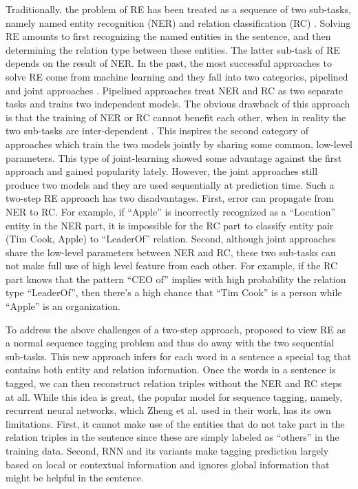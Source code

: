 Traditionally, the problem of RE has been treated as a sequence of two
sub-tasks, namely named entity recognition (NER) \cite{Nadeau2007} and relation
classification (RC) \cite{Zeng2014}.
Solving RE amounts to first recognizing the
named entities in the sentence, and then determining the relation type
between these entities. The latter sub-task of RE depends on the result of
NER. In the past, the most successful approaches to solve RE come from
machine learning and they fall into two categories, pipelined
\cite{Zeng2014,Wang2016,Wen2017,Cai2016,Zhou2016,Xu2015}
and joint approaches
\cite{Zheng2017a,Li2017a,Li2014,Adel2017,Gupta2016,Miwa2014,Kate2010,
  Miwa2016,Katiyar2017,Ren2017}. Pipelined approaches treat NER and RC as two
separate tasks and trains two independent models. The obvious
drawback of this approach is that the training of NER or RC cannot benefit
each other, when in reality the two sub-tasks are inter-dependent . This inspires the second category of approaches which train the
two models jointly by sharing some common, low-level parameters. 
This type of joint-learning
showed some advantage against the first approach and gained popularity lately.
However, the joint approaches still produce two models and they
are used sequentially at prediction time. Such a two-step RE approach has
two disadvantages. First, error can propagate from NER to RC. 
For example, if ``Apple'' is incorrectly recognized as a ``Location'' entity 
in the NER part, it is impossible for the RC part to classify entity pair 
(Tim Cook, Apple) to ``LeaderOf'' relation. Second, although joint approaches
share the low-level parameters between NER and RC, these two sub-tasks can not
make full use of high level feature from each other. For example, if the RC part
knows that the pattern ``CEO of'' implies with
high probability the relation type ``LeaderOf'', then there's a high chance that
``Tim Cook'' is a person while ``Apple'' is an organization.



To address the above challenges of a two-step approach, 
\citet{Zheng2017}
proposed to view RE as a normal sequence tagging problem and
thus do away with the two sequential sub-tasks. 
This new approach infers for each word in a
sentence a special tag that contains both entity and relation information. 
Once the words in a sentence is tagged, we can then reconstruct
relation triples without the NER and RC steps at all.
While this idea is great, the popular model for sequence tagging, namely,
recurrent neural networks, which Zheng et al. used in their work, has its
own limitations. First, it cannot make use of the entities that do not take
part in the relation triples in the sentence since these are simply labeled
as ``others'' in the training data. Second, RNN and its variants make tagging
prediction largely based on local or contextual information and ignores 
global information that might be helpful in the sentence.


